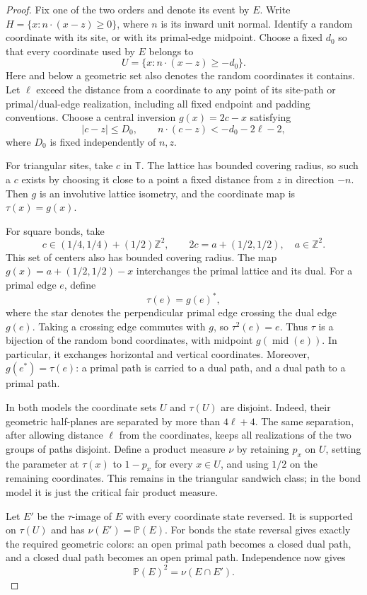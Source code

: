 \documentclass[11pt]{amsart}
\theoremstyle{remark}
\newcommand{\Prob}{\mathbb P}
\begin{document}
\begin{proof}
Fix one of the two orders and denote its event by $E$.
Write $H=\{x:n\cdot(x-z)\ge0\}$, where $n$ is its inward unit normal.
Identify a random coordinate with its site, or with its primal-edge midpoint.
Choose a fixed $d_0$ so that every coordinate used by $E$ belongs to
\[
 U=\{x:n\cdot(x-z)\ge-d_0\}.
\]
Here and below a geometric set also denotes the random coordinates it contains.
Let $\ell$ exceed the distance from a coordinate to any point of its site-path
or primal/dual-edge realization, including all fixed endpoint and padding
conventions.  Choose a central inversion $g(x)=2c-x$ satisfying
\begin{equation*}
 |c-z|\le D_0,\qquad
 n\cdot(c-z)<-d_0-2\ell-2,
\end{equation*}
where $D_0$ is fixed independently of $n,z$.

For triangular sites, take $c$ in $\mathbb T$.  The lattice has bounded
covering radius, so such a $c$ exists by choosing it close to a point a fixed
distance from $z$ in direction $-n$.  Then $g$ is an involutive lattice
isometry, and the coordinate map is $\tau(x)=g(x)$.

For square bonds, take
\[
 c\in(1/4,1/4)+(1/2)\mathbb Z^2,
 \qquad 2c=a+(1/2,1/2),\quad a\in\mathbb Z^2.
\]
This set of centers also has bounded covering radius.  The map
$g(x)=a+(1/2,1/2)-x$ interchanges the primal lattice and its dual.  For a
primal edge $e$, define
\[
 \tau(e)=g(e)^*,
\]
where the star denotes the perpendicular primal edge crossing the dual edge
$g(e)$.  Taking a crossing edge commutes with $g$, so $\tau^2(e)=e$.
Thus $\tau$ is a bijection of the random bond coordinates, with midpoint
$g(\operatorname{mid}(e))$.  In particular, it exchanges horizontal and
vertical coordinates.  Moreover,
$g(e^*)=\tau(e)$: a primal path is carried to a dual path, and a dual path
to a primal path.

In both models the coordinate sets $U$ and $\tau(U)$ are disjoint.  Indeed,
their geometric half-planes are separated by more than $4\ell+4$.
The same separation, after allowing distance $\ell$ from the coordinates,
keeps all realizations of the two groups of paths disjoint.
Define a product measure $\nu$ by retaining $p_x$ on $U$, setting the
parameter at $\tau(x)$ to $1-p_x$ for every $x\in U$, and using $1/2$
on the remaining coordinates.  This remains in the triangular sandwich
class; in the bond model it is just the critical fair product measure.

Let $E'$ be the $\tau$-image of $E$ with every coordinate state reversed.
It is supported on $\tau(U)$ and has $\nu(E')=\Prob(E)$.
For bonds the state reversal gives exactly the required geometric colors:
an open primal path becomes a closed dual path, and a closed dual path
becomes an open primal path.  Independence now gives
\begin{equation}\label{eq:reflectsquare}
 \Prob(E)^2=\nu(E\cap E').
\end{equation}


\end{proof}
\end{document}
